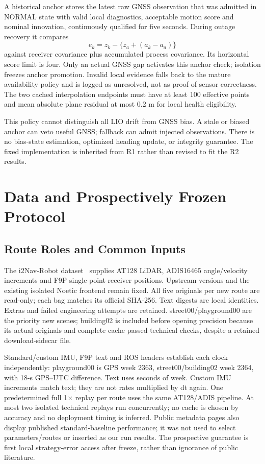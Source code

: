 \documentclass[conference]{IEEEtran}
\begin{document}
A historical anchor stores the latest raw GNSS observation that was admitted in NORMAL state with valid local diagnostics, acceptable motion score and nominal innovation, continuously qualified for five seconds. During outage recovery it compares
\begin{equation}
 e_k=z_k-\{z_a+(a_k-a_a)\}
\end{equation}
against receiver covariance plus accumulated process covariance. Its horizontal score limit is four. Only an actual GNSS gap activates this anchor check; isolation freezes anchor promotion. Invalid local evidence falls back to the mature availability policy and is logged as unresolved, not as proof of sensor correctness. The two cached interpolation endpoints must have at least 100 effective points and mean absolute plane residual at most 0.2 m for local health eligibility.

This policy cannot distinguish all LIO drift from GNSS bias. A stale or biased anchor can veto useful GNSS; fallback can admit injected observations. There is no bias-state estimation, optimized heading update, or integrity guarantee. The fixed implementation is inherited from R1 rather than revised to fit the R2 results.



\section{Data and Prospectively Frozen Protocol}
\subsection{Route Roles and Common Inputs}
The i2Nav-Robot dataset~\cite{i2nav} supplies AT128 LiDAR, ADIS16465 angle/velocity increments and F9P single-point receiver positions. Upstream versions and the existing isolated Noetic frontend remain fixed. All five originals per new route are read-only; each bag matches its official SHA-256. Text digests are local identities. Extras and failed engineering attempts are retained. street00/playground00 are the priority new scenes; building02 is included before opening precision because its actual originals and complete cache passed technical checks, despite a retained download-sidecar file.

Standard/custom IMU, F9P text and ROS headers establish each clock independently: playground00 is GPS week 2363, street00/building02 week 2364, with 18-s GPS--UTC difference. Text uses seconds of week. Custom IMU increments match text; they are not rates multiplied by dt again. One predetermined full 1$\times$ replay per route uses the same AT128/ADIS pipeline. At most two isolated technical replays run concurrently; no cache is chosen by accuracy and no deployment timing is inferred. Public metadata pages also display published standard-baseline performance; it was not used to select parameters/routes or inserted as our run results. The prospective guarantee is first local strategy-error access after freeze, rather than ignorance of public literature.
\end{document}
